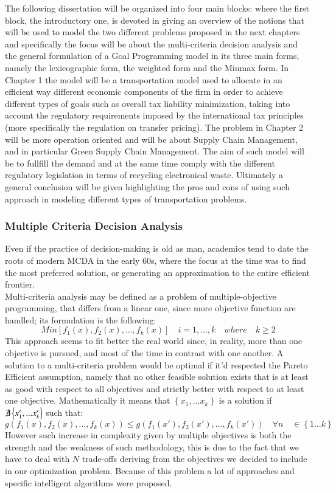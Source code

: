\begin{doublespace}
The following dissertation will be organized into four main blocks: where the first block, the introductory one, is devoted in giving an overview of the notions that will be used to model the two different problems proposed in the next chapters and specifically the focus will be about the multi-criteria decision analysis and the general formulation of a Goal Programming model in its three main forms, namely the lexicographic form, the weighted form and the Minmax form. In Chapter 1 the model will be a transportation model used to allocate in an efficient way different economic components of the firm in order to achieve different types of goals such as overall tax liability minimization, taking into account the regulatory requirements imposed by the international tax principles (more specifically the regulation on transfer pricing). The problem in Chapter 2 will be more operation oriented and will be about Supply Chain Management, and in particular Green Supply Chain Management. The aim of such model will be to fullfill the demand and at the same time comply with the different regulatory legislation in terms of recycling electronical waste. Ultimately a general conclusion will be given highlighting the pros and cons of using such approach in modeling different types of transportation problems.

\subsubsection{Multiple Criteria Decision Analysis}
Even if the practice of decision-making is old as man, academics tend to date the roots of modern MCDA in the early 60s, where the focus at the time was to find the most preferred solution, or generating an approximation to the entire efficient frontier\cite{Greco2016}.
\\
Multi-criteria analysis may be defined as a problem of multiple-objective programming, that differs from a linear one,
since more objective function are handled; its formulation is the following:
	$$
	Min[f_1(x),f_2(x),...,f_k(x)] \quad i=1,...,k \quad where \quad k\geq2
	$$
This approach seems to fit better the real world since, in reality, more than one objective is pursued, and most of the time in contrast with one another.
A solution to a multi-criteria problem would be optimal if it'd respected the Pareto Efficient assumption, namely that no other feasible solution exists that is at least as good with respect to all objectives and strictly better with respect to at least one objective. Mathematically it means that $\left\{x_1,...x_k\right\}$ is a solution if $\not\exists \left\{x'_1,...x'_k\right\}$
such that:
	\[
	g(f_1(x),f_2(x),...,f_k(x)) \leq g(f_1(x'),f_2(x'),...,f_k(x')) \quad \forall n \quad \in  \left\{1...k\right\}
	\]
However such increase in complexity given by multiple objectives is both the strength and the weakness of such methodology, this is due to the fact that we have to deal with $N$ trade-offs deriving from the objectives we decided to include in our optimization problem. Because of this problem a lot of approaches and specific intelligent algorithms were proposed\cite{Cui2017}.


\end{doublespace}
